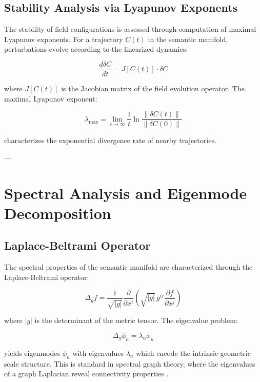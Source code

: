 \subsection{Stability Analysis via Lyapunov Exponents}

The stability of field configurations is assessed through computation of maximal Lyapunov exponents. For a trajectory $C(t)$ in the semantic manifold, perturbations evolve according to the linearized dynamics:

\begin{equation}
\frac{d\delta C}{dt} = J[C(t)] \cdot \delta C
\end{equation}

where $J[C(t)]$ is the Jacobian matrix of the field evolution operator. The maximal Lyapunov exponent:

\begin{equation}
\lambda_{\max} = \lim_{t \to \infty} \frac{1}{t} \ln \frac{\|\delta C(t)\|}{\|\delta C(0)\|}
\end{equation}

characterizes the exponential divergence rate of nearby trajectories.

---

\section{Spectral Analysis and Eigenmode Decomposition}

\subsection{Laplace-Beltrami Operator}

The spectral properties of the semantic manifold are characterized through the Laplace-Beltrami operator:

\begin{equation}
\Delta_g f = \frac{1}{\sqrt{|g|}} \frac{\partial}{\partial x^i} \left(\sqrt{|g|} \, g^{ij} \frac{\partial f}{\partial x^j}\right)
\end{equation}

where $|g|$ is the determinant of the metric tensor. The eigenvalue problem:

\begin{equation}
\Delta_g \phi_n = \lambda_n \phi_n
\end{equation}

yields eigenmodes $\phi_n$ with eigenvalues $\lambda_n$ which encode the intrinsic geometric scale structure. This is standard in spectral graph theory, where the eigenvalues of a graph Laplacian reveal connectivity properties \autocite{Chung1997}.

